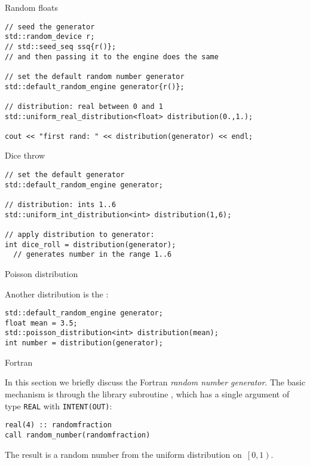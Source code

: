  {Random floats}

\begin{lstlisting}
// seed the generator
std::random_device r;
// std::seed_seq ssq{r()};
// and then passing it to the engine does the same

// set the default random number generator
std::default_random_engine generator{r()};

// distribution: real between 0 and 1
std::uniform_real_distribution<float> distribution(0.,1.);

cout << "first rand: " << distribution(generator) << endl;
\end{lstlisting}

 {Dice throw}

\begin{lstlisting}
// set the default generator
std::default_random_engine generator;

// distribution: ints 1..6
std::uniform_int_distribution<int> distribution(1,6);

// apply distribution to generator:
int dice_roll = distribution(generator);
  // generates number in the range 1..6 
\end{lstlisting}

 {Poisson distribution}

  Another distribution is the :
\begin{lstlisting}
std::default_random_engine generator;
float mean = 3.5;
std::poisson_distribution<int> distribution(mean);
int number = distribution(generator);
\end{lstlisting}


 {Fortran}
\lstset{language=Fortran}

In this section we briefly discuss the Fortran \emph{random number generator}.
The basic mechanism is through the library subroutine
, which has a single argument of type
\lstinline{REAL} with \lstinline{INTENT(OUT)}:
\begin{lstlisting}
real(4) :: randomfraction
call random_number(randomfraction)
\end{lstlisting}
The result is a random number from the uniform distribution
on~$\left[0,1\right)$.
  
